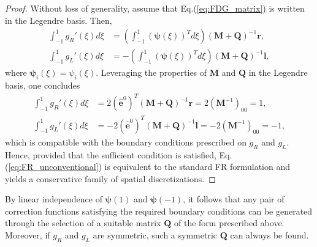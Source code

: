 \documentclass[preprint,12pt]{elsarticle}
\begin{document}
\begin{proof}
 Without loss of generality, assume that Eq.(\ref{eq:FDG_matrix}) is written in the Legendre basis. Then,
 \begin{align}
     \int_{-1}^{1} g_R'(\xi) d\xi &= \left(\int_{-1}^{1} (\bm{\psi}(\xi))^Td\xi\right)(\mathbf{M} + \mathbf{Q})^{-1} \mathbf{r}, \\
    \int_{-1}^{1} g_L'(\xi) d\xi &= -\left(\int_{-1}^{1} (\bm{\psi}(\xi))^Td\xi\right)(\mathbf{M} + \mathbf{Q})^{-1} \mathbf{l},
 \end{align}
 where $\bm{\psi}_i(\xi) = \psi_i(\xi)$. Leveraging the properties of $\mathbf{M}$ and $\mathbf{Q}$ in the Legendre basis, one concludes
 \begin{align}
     \int_{-1}^{1} g_R'(\xi) d\xi &=
     2(\hat{\mathbf{e}}^0)^T (\mathbf{M} + \mathbf{Q})^{-1} \mathbf{r} = 2(\mathbf{M}^{-1})_{00} =1, \\
     \int_{-1}^{1} g_L'(\xi) d\xi &=
     -2(\hat{\mathbf{e}}^0)^T (\mathbf{M} + \mathbf{Q})^{-1} \mathbf{l} = -2(\mathbf{M}^{-1})_{00} = -1,
 \end{align}
 which is compatible with the boundary conditions prescribed on $g_R$ and $g_L$. Hence, provided that the sufficient condition is satisfied, Eq.(\ref{eq:FR_unconventional}) is equivalent to the standard FR formulation and yields a conservative family of spatial discretizations.
\end{proof}

By linear independence of $\bm{\psi}(1)$ and $\bm{\psi}(-1)$, it follows that any pair of correction functions satisfying the required boundary conditions can be generated through the selection of a suitable matrix $\mathbf{Q}$ of the form prescribed above. Moreover, if $g_R$ and $g_L$ are symmetric, such a symmetric $\mathbf{Q}$ can always be found.
\end{document}

